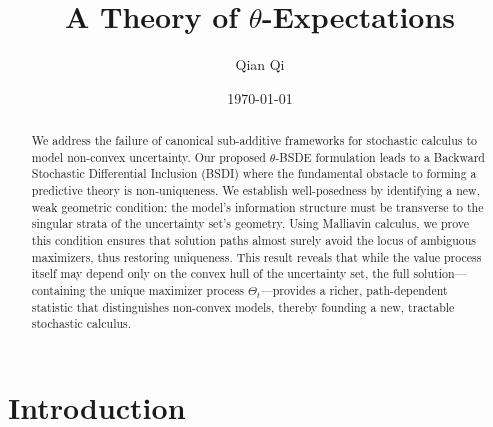 \documentclass[12pt, letterpaper]{amsart}
\theoremstyle{plain}
\theoremstyle{definition}
\theoremstyle{remark}
\numberwithin{equation}{section} %
\begin{document}
\title[A Theory of $\theta$-Expectations]{A Theory of $\theta$-Expectations}

\author{Qian Qi}
\address{Peking University, Beijing 100871, China}
\date{\today}

\begin{abstract}
We address the failure of canonical sub-additive frameworks for stochastic calculus to model non-convex uncertainty. Our proposed \(\theta\)-BSDE formulation leads to a Backward Stochastic Differential Inclusion (BSDI) where the fundamental obstacle to forming a predictive theory is non-uniqueness. We establish well-posedness by identifying a new, weak geometric condition: the model's information structure must be transverse to the singular strata of the uncertainty set's geometry. Using Malliavin calculus, we prove this condition ensures that solution paths almost surely avoid the locus of ambiguous maximizers, thus restoring uniqueness. This result reveals that while the value process itself may depend only on the convex hull of the uncertainty set, the full solution—containing the unique maximizer process \(\Theta_t\)—provides a richer, path-dependent statistic that distinguishes non-convex models, thereby founding a new, tractable stochastic calculus.
\end{abstract}

\maketitle
\tableofcontents

\section{Introduction}
\end{document}
